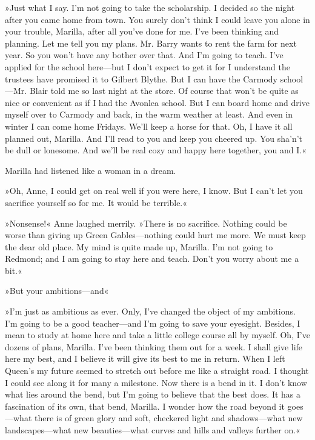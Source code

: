 »Just what I say. I'm not going to take the scholarship. I decided so the night after you came home from town. You surely don't think I could leave you alone in your trouble, Marilla, after all you've done for me. I've been thinking and planning. Let me tell you my plans. Mr. Barry wants to rent the farm for next year. So you won't have any bother over that. And I'm going to teach. I've applied for the school here—but I don't expect to get it for I understand the trustees have promised it to Gilbert Blythe. But I can have the Carmody school—Mr. Blair told me so last night at the store. Of course that won't be quite as nice or convenient as if I had the Avonlea school. But I can board home and drive myself over to Carmody and back, in the warm weather at least. And even in winter I can come home Fridays. We'll keep a horse for that. Oh, I have it all planned out, Marilla. And I'll read to you and keep you cheered up. You sha'n't be dull or lonesome. And we'll be real cozy and happy here together, you and I.«

Marilla had listened like a woman in a dream.

»Oh, Anne, I could get on real well if you were here, I know. But I can't let you sacrifice yourself so for me. It would be terrible.«

»Nonsense!« Anne laughed merrily. »There is no sacrifice. Nothing could be worse than giving up Green Gables—nothing could hurt me more. We must keep the dear old place. My mind is quite made up, Marilla. I'm not going to Redmond; and I am going to stay here and teach. Don't you worry about me a bit.«

»But your ambitions—and\longdash«

»I'm just as ambitious as ever. Only, I've changed the object of my ambitions. I'm going to be a good teacher—and I'm going to save your eyesight. Besides, I mean to study at home here and take a little college course all by myself. Oh, I've dozens of plans, Marilla. I've been thinking them out for a week. I shall give life here my best, and I believe it will give its best to me in return. When I left Queen's my future seemed to stretch out before me like a straight road. I thought I could see along it for many a milestone. Now there is a bend in it. I don't know what lies around the bend, but I'm going to believe that the best does. It has a fascination of its own, that bend, Marilla. I wonder how the road beyond it goes—what there is of green glory and soft, checkered light and shadows—what new landscapes—what new beauties—what curves and hills and valleys further on.«

